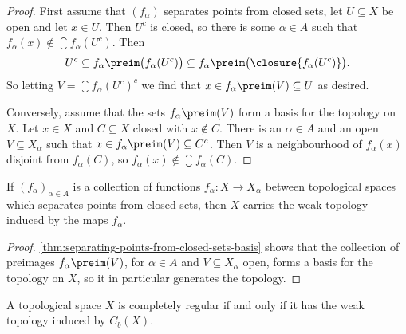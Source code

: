 \documentclass[article, a4paper, 11pt, oneside]{memoir}
\numberwithin{equation}{chapter}
\begin{document}
\begin{proof}
    First assume that $(f_\alpha)$ separates points from closed sets, let $U \subseteq X$ be open and let $x \in U$. Then $U^c$ is closed, so there is some $\alpha \in A$ such that $f_\alpha(x) \not\in \closure{f_\alpha(U^c)}$. Then
    \begin{equation*}
        U^c
            \subseteq f_\alpha\preim \bigl( f_\alpha(U^c) \bigr)
            \subseteq f_\alpha\preim \bigl( \closure{f_\alpha(U^c)} \bigr).
    \end{equation*}
    So letting $V = \closure{f_\alpha(U^c)}^c$ we find that $x \in f_\alpha\preim(V) \subseteq U$ as desired.

    Conversely, assume that the sets $f_\alpha\preim(V)$ form a basis for the topology on $X$. Let $x \in X$ and $C \subseteq X$ closed with $x \not\in C$. There is an $\alpha \in A$ and an open $V \subseteq X_\alpha$ such that $x \in f_\alpha\preim(V) \subseteq C^c$. Then $V$ is a neighbourhood of $f_\alpha(x)$ disjoint from $f_\alpha(C)$, so $f_\alpha(x) \not\in \closure{f_\alpha(C)}$.
\end{proof}


\begin{corollary}
    \label{thm:separating-points-from-closed-sets-weak-topology}
    If $(f_\alpha)_{\alpha \in A}$ is a collection of functions $f_\alpha \colon X \to X_\alpha$ between topological spaces which separates points from closed sets, then $X$ carries the weak topology induced by the maps $f_\alpha$.
\end{corollary}

\begin{proof}
    \cref{thm:separating-points-from-closed-sets-basis} shows that the collection of preimages $f_\alpha\preim(V)$, for $\alpha \in A$ and $V \subseteq X_\alpha$ open, forms a basis for the topology on $X$, so it in particular generates the topology.
\end{proof}



\begin{theorem}
    \label{thm:completely-regular-weak-topology}
    A topological space $X$ is completely regular if and only if it has the weak topology induced by $C_b(X)$.
\end{theorem}
\end{document}
